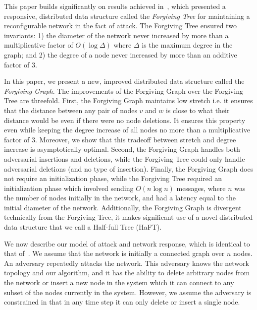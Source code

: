 \documentclass[11pt, letter]{article}
\begin{document}
This paper builds significantly on results achieved in~\cite{HayesPODC08}, which presented a responsive, distributed data structure called the \emph{Forgiving Tree} for maintaining a reconfigurable network in the fact of attack. The Forgiving Tree ensured two invariants: 1) the diameter of the network never increased by more than a multiplicative factor of $O(\log \Delta)$ where $\Delta$ is the maximum degree in the graph; and 2) the degree of a node never increased by more than an additive factor of $3$.  

In this paper, we present a new, improved distributed data structure called the \emph{Forgiving Graph}.  The improvements of the Forgiving Graph over the Forgiving Tree are threefold.  First, the Forgiving Graph maintains 
low stretch i.e. it ensures that the distance between any pair of nodes $v$ and $w$ is close to what their distance would be even if there were no node deletions.  It ensures this property even while keeping the degree increase of all nodes no more than a multiplicative factor of $3$.  Moreover, we show that this tradeoff between stretch and degree increase is asymptotically optimal.  Second, the Forgiving Graph handles both adversarial insertions and deletions, while the Forgiving Tree could only handle adversarial deletions (and no type of insertion).  Finally, the Forgiving Graph does not require an initialization phase, while the Forgiving Tree required an initialization phase which involved sending $O(n \log n)$ messages, where $n$ was the number of nodes initially in the network, and had a latency equal to the initial diameter of the network.  Additionally, the Forgiving Graph is divergent technically from the Forgiving Tree, it makes significant use of a novel distributed data structure that we call a Half-full Tree (HaFT). 

\medskip
{} We now describe our model of attack and
network response, which is identical to that of~\cite{HayesPODC08}.  We assume that the network is initially a connected
graph over $n$ nodes.  An adversary repeatedly attacks the
network. This adversary knows the network topology and our
algorithm, and it has the ability to delete arbitrary nodes from the
 network or insert a new node in the system which it can connect to any subset of the nodes currently in the system.  
However, we assume the adversary is constrained in that in any time step it can only delete or insert a single node. 
\end{document}
